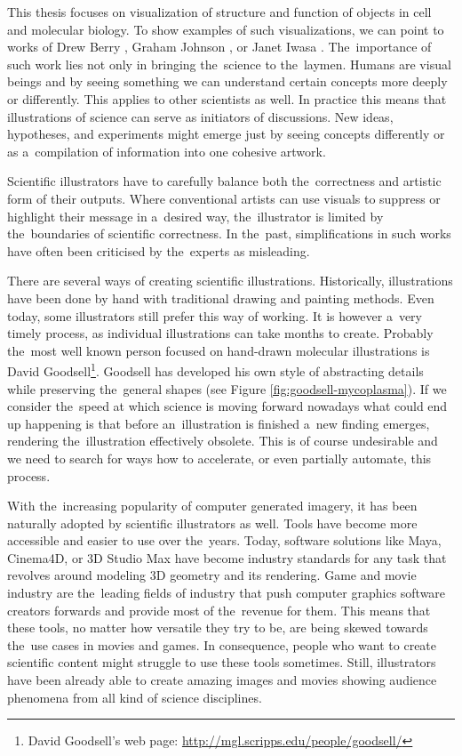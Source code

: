 \documentclass[
  digital, %
  table,   %
  nolof,     %
  nolot,     %
  oneside,
]{fithesis3}
\begin{document}
This thesis focuses on visualization of structure and function of objects in cell and molecular biology. To show examples of such visualizations, we can point to works of Drew Berry \cite{DrewBerryMovies}, Graham Johnson \cite{GrahamCellVideo}, or Janet Iwasa \cite{iwasa2010animating}. The importance of such work lies not only in bringing the science to the laymen. Humans are visual beings and by seeing something we can understand certain concepts more deeply or differently. This applies to other scientists as well. In practice this means that illustrations of science can serve as initiators of discussions. New ideas, hypotheses, and experiments might emerge just by seeing concepts differently or as a compilation of information into one cohesive artwork.

Scientific illustrators have to carefully balance both the correctness and artistic form of their outputs. Where conventional artists can use visuals to suppress or highlight their message in a desired way, the illustrator is limited by the boundaries of scientific correctness. In the past, simplifications in such works have often been criticised by the experts as misleading.

There are several ways of creating scientific illustrations. Historically, illustrations have been done by hand with traditional drawing and painting methods. Even today, some illustrators still prefer this way of working. It is however a very timely process, as individual illustrations can take months to create. Probably the most well known person focused on hand-drawn molecular illustrations is David Goodsell\footnote{
  David Goodsell's web page: \url{http://mgl.scripps.edu/people/goodsell/}
}. Goodsell has developed his own style of abstracting details while preserving the general shapes (see Figure \ref{fig:goodsell-mycoplasma}). If we consider the speed at which science is moving forward nowadays what could end up happening is that before an illustration is finished a new finding emerges, rendering the illustration effectively obsolete. This is of course undesirable and we need to search for ways how to accelerate, or even partially automate, this process.

With the increasing popularity of computer generated imagery, it has been naturally adopted by scientific illustrators as well. Tools have become more accessible and easier to use over the years. Today, software solutions like Maya, Cinema4D, or 3D Studio Max have become industry standards for any task that revolves around modeling 3D geometry and its rendering. Game and movie industry are the leading fields of industry that push computer graphics software creators forwards and provide most of the revenue for them. This means that these tools, no matter how versatile they try to be, are being skewed towards the use cases in movies and games. In consequence, people who want to create scientific content might struggle to use these tools sometimes. Still, illustrators have been already able to create amazing images and movies showing audience phenomena from all kind of science disciplines.
\end{document}
